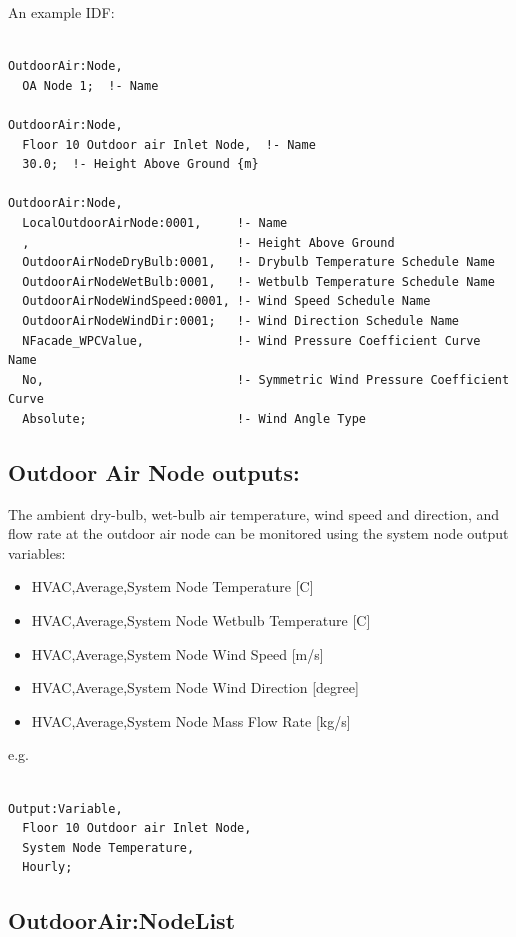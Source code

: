 An example IDF:

\begin{lstlisting}

OutdoorAir:Node,
  OA Node 1;  !- Name

OutdoorAir:Node,
  Floor 10 Outdoor air Inlet Node,  !- Name
  30.0;  !- Height Above Ground {m}

OutdoorAir:Node,
  LocalOutdoorAirNode:0001,     !- Name
  ,                             !- Height Above Ground
  OutdoorAirNodeDryBulb:0001,   !- Drybulb Temperature Schedule Name
  OutdoorAirNodeWetBulb:0001,   !- Wetbulb Temperature Schedule Name
  OutdoorAirNodeWindSpeed:0001, !- Wind Speed Schedule Name
  OutdoorAirNodeWindDir:0001;   !- Wind Direction Schedule Name
  NFacade_WPCValue,             !- Wind Pressure Coefficient Curve Name
  No,                           !- Symmetric Wind Pressure Coefficient Curve
  Absolute;                     !- Wind Angle Type
\end{lstlisting}

\subsection{Outdoor Air Node outputs:}\label{outdoor-air-node-outputs}

The ambient dry-bulb, wet-bulb air temperature, wind speed and direction, and flow rate at the outdoor air node can be monitored using the system node output variables:

\begin{itemize}
\item
  HVAC,Average,System Node Temperature {[}C{]}
\item
  HVAC,Average,System Node Wetbulb Temperature {[}C{]}
\item
  HVAC,Average,System Node Wind Speed {[}m/s{]}
\item
  HVAC,Average,System Node Wind Direction {[}degree{]}
\item
  HVAC,Average,System Node Mass Flow Rate {[}kg/s{]}
\end{itemize}

e.g.

\begin{lstlisting}

Output:Variable,
  Floor 10 Outdoor air Inlet Node,
  System Node Temperature,
  Hourly;
\end{lstlisting}


\subsection{OutdoorAir:NodeList}\label{outdoorairnodelist}

